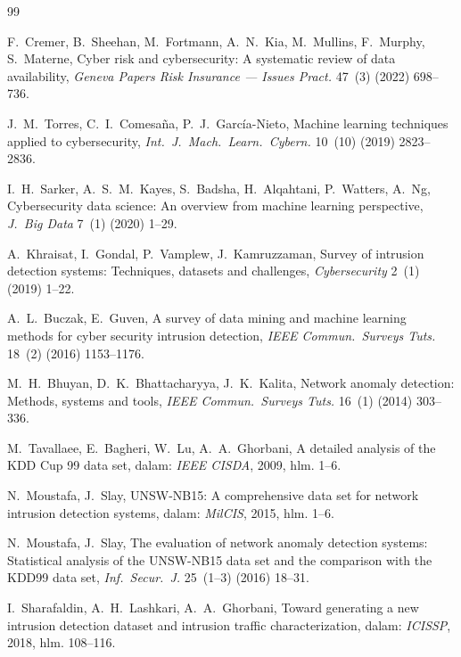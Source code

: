 \documentclass[11pt,a4paper]{article}
\begin{document}
\begin{thebibliography}{99}

 F.~Cremer, B.~Sheehan, M.~Fortmann, A.~N.~Kia, M.~Mullins,
F.~Murphy, S.~Materne, Cyber risk and cybersecurity: A systematic review of data
availability, \emph{Geneva Papers Risk Insurance --- Issues Pract.} 47~(3) (2022)
698--736.

 J.~M.~Torres, C.~I.~Comesa\~na, P.~J.~Garc\'ia-Nieto, Machine
learning techniques applied to cybersecurity, \emph{Int.\ J.\ Mach.\ Learn.\
Cybern.} 10~(10) (2019) 2823--2836.

 I.~H.~Sarker, A.~S.~M.~Kayes, S.~Badsha, H.~Alqahtani, P.~Watters,
A.~Ng, Cybersecurity data science: An overview from machine learning perspective,
\emph{J.\ Big Data} 7~(1) (2020) 1--29.

 A.~Khraisat, I.~Gondal, P.~Vamplew, J.~Kamruzzaman, Survey of
intrusion detection systems: Techniques, datasets and challenges,
\emph{Cybersecurity} 2~(1) (2019) 1--22.

 A.~L.~Buczak, E.~Guven, A survey of data mining and machine
learning methods for cyber security intrusion detection, \emph{IEEE Commun.\
Surveys Tuts.} 18~(2) (2016) 1153--1176.

 M.~H.~Bhuyan, D.~K.~Bhattacharyya, J.~K.~Kalita, Network anomaly
detection: Methods, systems and tools, \emph{IEEE Commun.\ Surveys Tuts.} 16~(1)
(2014) 303--336.

 M.~Tavallaee, E.~Bagheri, W.~Lu, A.~A.~Ghorbani, A detailed analysis
of the KDD Cup 99 data set, dalam: \emph{IEEE CISDA}, 2009, hlm. 1--6.

\bibitem{moustafa2015} N.~Moustafa, J.~Slay, UNSW-NB15: A comprehensive data set for
network intrusion detection systems, dalam: \emph{MilCIS}, 2015, hlm. 1--6.

\bibitem{unsweval} N.~Moustafa, J.~Slay, The evaluation of network anomaly detection
systems: Statistical analysis of the UNSW-NB15 data set and the comparison with the
KDD99 data set, \emph{Inf.\ Secur.\ J.} 25~(1--3) (2016) 18--31.

\bibitem{sharafaldin2018} I.~Sharafaldin, A.~H.~Lashkari, A.~A.~Ghorbani, Toward
generating a new intrusion detection dataset and intrusion traffic characterization,
dalam: \emph{ICISSP}, 2018, hlm. 108--116.


\end{thebibliography}
\end{document}
